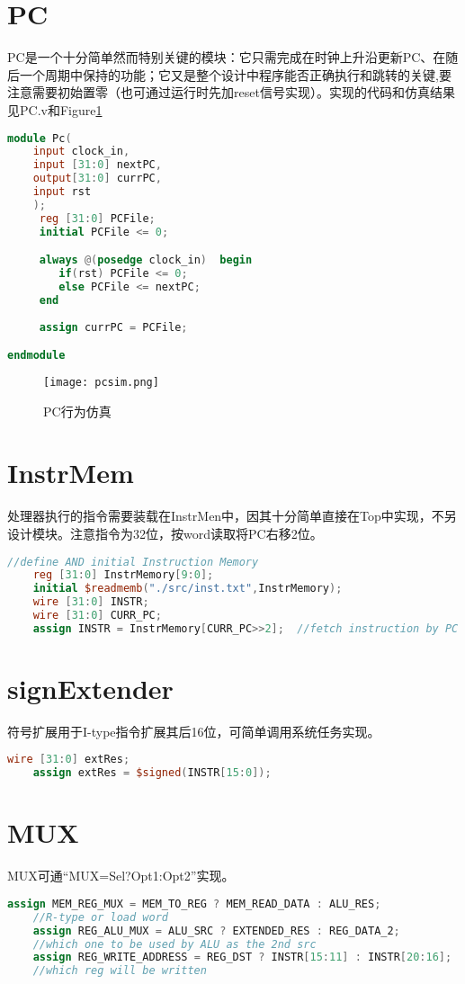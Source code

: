 \documentclass[a4paper]{article}
\begin{document}
\section{PC}
    PC是一个十分简单然而特别关键的模块：它只需完成在时钟上升沿更新PC、在随后一个周期中保持的功能；它又是整个设计中程序能否正确执行和跳转的关键,要注意需要初始置零（也可通过运行时先加reset信号实现）。实现的代码和仿真结果见PC.v和Figure\ref{PCSIM}
    \begin{lstlisting}[language={Verilog},title={PC.v}]
module Pc(
    input clock_in,
    input [31:0] nextPC,
    output[31:0] currPC,
    input rst
    );	
	 reg [31:0] PCFile;
	 initial PCFile <= 0;

	 always @(posedge clock_in)	 begin
		if(rst) PCFile <= 0;
		else PCFile <= nextPC;
	 end
	
	 assign currPC = PCFile;

endmodule   \end{lstlisting}
    \begin{figure}[h]
    \centering
    \texttt{[image: pcsim.png]}
    \caption{PC行为仿真}\label{PCSIM}
    \end{figure}


\section{InstrMem}
    处理器执行的指令需要装载在InstrMen中，因其十分简单直接在Top中实现，不另设计模块。注意指令为32位，按word读取将PC右移2位。
    \begin{lstlisting}[language={Verilog},title={instrMem.v}]
    //define AND initial Instruction Memory
	reg [31:0] InstrMemory[9:0];
	initial $readmemb("./src/inst.txt",InstrMemory);
    wire [31:0] INSTR;
    wire [31:0] CURR_PC;
	assign INSTR = InstrMemory[CURR_PC>>2];  //fetch instruction by PC   \end{lstlisting}

\section{signExtender}
    符号扩展用于I-type指令扩展其后16位，可简单调用系统任务实现。
    \begin{lstlisting}[language={Verilog},title={signExtender.v}]
    wire [31:0] extRes;
    assign extRes = $signed(INSTR[15:0]);   \end{lstlisting}
\section{MUX}
    MUX可通``MUX=Sel\quad ?Opt1:Opt2''实现。
    \begin{lstlisting}[language={Verilog},title={MUXes.v}]
	assign MEM_REG_MUX = MEM_TO_REG ? MEM_READ_DATA : ALU_RES;	
	//R-type or load word
	assign REG_ALU_MUX = ALU_SRC ? EXTENDED_RES : REG_DATA_2;
	//which one to be used by ALU as the 2nd src
	assign REG_WRITE_ADDRESS = REG_DST ? INSTR[15:11] : INSTR[20:16];
	//which reg will be written   \end{lstlisting}
\end{document}
